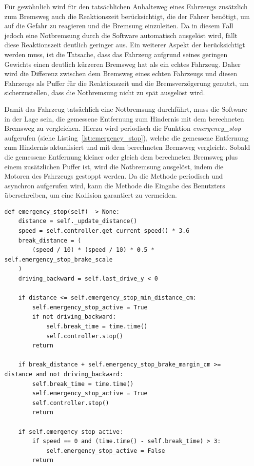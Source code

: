     Für gewöhnlich wird für den tatsächlichen Anhalteweg eines Fahrzeugs zusätzlich zum Bremsweg auch die Reaktionszeit berücksichtigt, die der Fahrer benötigt, um auf die Gefahr zu reagieren und die Bremsung einzuleiten. Da in diesem Fall jedoch eine Notbremsung durch die Software automatisch ausgelöst wird, fällt diese Reaktionszeit deutlich geringer aus. Ein weiterer Aspekt der berücksichtigt werden muss, ist die Tatsache, dass das Fahrzeug aufgrund seines geringen Gewichts einen deutlich kürzeren Bremsweg hat als ein echtes Fahrzeug. Daher wird die Differenz zwischen dem Bremsweg eines echten Fahrzeugs und diesen Fahrzeugs als Puffer für die Reaktionszeit und die Bremsverzögerung genutzt, um sicherzustellen, dass die Notbremsung nicht zu spät ausgelöst wird.

    Damit das Fahrzeug tatsächlich eine Notbremsung durchführt, muss die Software in der Lage sein, die gemessene Entfernung zum Hindernis mit dem berechneten Bremsweg zu vergleichen. Hierzu wird periodisch die Funktion \emph{emergency\_stop} aufgerufen (siehe Listing~\ref{lst:emergency_stop}), welche die gemessene Entfernung zum Hindernis aktualisiert und mit dem berechneten Bremsweg vergleicht. Sobald die gemessene Entfernung kleiner oder gleich dem berechneten Bremsweg plus einem zusätzlichen Puffer ist, wird die Notbremsung ausgelöst, indem die Motoren des Fahrzeugs gestoppt werden. Da die Methode periodisch und asynchron aufgerufen wird, kann die Methode die Eingabe des Benutzters überschreiben, um eine Kollision garantiert zu vermeiden.

     \begin{lstlisting}[caption={Funktion zur Durchführen einer Notbremsung}, label={lst:emergency_stop}]
def emergency_stop(self) -> None:
    distance = self._update_distance()
    speed = self.controller.get_current_speed() * 3.6
    break_distance = (
        (speed / 10) * (speed / 10) * 0.5 * self.emergency_stop_brake_scale
    )
    driving_backward = self.last_drive_y < 0

    if distance <= self.emergency_stop_min_distance_cm:
        self.emergency_stop_active = True
        if not driving_backward:
            self.break_time = time.time()
            self.controller.stop()
        return

    if break_distance + self.emergency_stop_brake_margin_cm >= distance and not driving_backward:
        self.break_time = time.time()
        self.emergency_stop_active = True
        self.controller.stop()
        return

    if self.emergency_stop_active:
        if speed == 0 and (time.time() - self.break_time) > 3:
            self.emergency_stop_active = False
        return
        \end{lstlisting}


